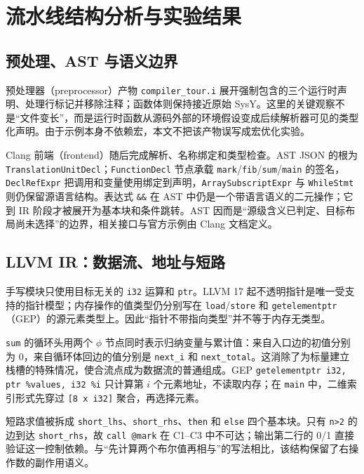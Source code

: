 \section{流水线结构分析与实验结果}
\label{sec:results}

\subsection{预处理、AST 与语义边界}

预处理器（preprocessor）产物 \texttt{compiler\_tour.i} 展开强制包含的三个运行时声明、处理行标记并移除注释；函数体则保持接近原始 SysY。这里的关键观察不是“文件变长”，而是运行时函数从源码外部的环境假设变成后续解析器可见的类型化声明。由于示例本身不依赖宏，本文不把该产物误写成宏优化实验。

Clang 前端（frontend）随后完成解析、名称绑定和类型检查。AST JSON 的根为 \texttt{TranslationUnitDecl}；\texttt{FunctionDecl} 节点承载 \texttt{mark}/\texttt{fib}/\texttt{sum}/\texttt{main} 的签名，\texttt{DeclRefExpr} 把调用和变量使用绑定到声明，\texttt{ArraySubscriptExpr} 与 \texttt{WhileStmt} 则仍保留源语言结构。表达式 \texttt{\&\&} 在 AST 中仍是一个带语言语义的二元操作；它到 IR 阶段才被展开为基本块和条件跳转。AST 因而是“源级含义已判定、目标布局尚未选择”的边界，相关接口与官方示例由 Clang 文档定义\cite{clangAst}。

\subsection{LLVM IR：数据流、地址与短路}

手写模块只使用目标无关的 \texttt{i32} 运算和 \texttt{ptr}。LLVM 17 起不透明指针是唯一受支持的指针模型；内存操作的值类型仍分别写在 \texttt{load}/\texttt{store} 和 \texttt{getelementptr}（GEP）的源元素类型上\cite{llvmOpaque,llvmLangRef}。因此“指针不带指向类型”并不等于内存无类型。

\texttt{sum} 的循环头用两个 $\phi$ 节点同时表示归纳变量与累计值：来自入口边的初值分别为 0，来自循环体回边的值分别是 \texttt{next\_i} 和 \texttt{next\_total}。这消除了为标量建立栈槽的特殊情况，使合流点成为数据流的普通组成。GEP \texttt{getelementptr i32, ptr \%values, i32 \%i} 只计算第 $i$ 个元素地址，不读取内存；在 \texttt{main} 中，二维索引形式先穿过 \texttt{[8 x i32]} 聚合，再选择元素。

短路求值被拆成 \texttt{short\_lhs}、\texttt{short\_rhs}、\texttt{then} 和 \texttt{else} 四个基本块。只有 \texttt{n>2} 的边到达 \texttt{short\_rhs}，故 \texttt{call @mark} 在 C1--C3 中不可达；输出第二行的 0/1 直接验证这一控制依赖。与“先计算两个布尔值再相与”的写法相比，该结构保留了右操作数的副作用语义。

